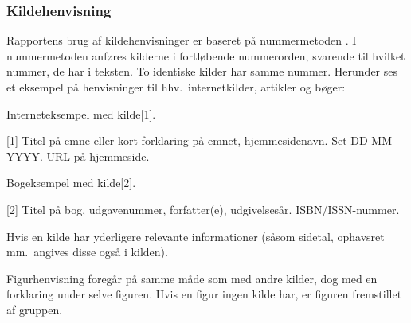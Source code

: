 \subsubsection{Kildehenvisning}
Rapportens brug af kildehenvisninger er baseret på nummermetoden \cite{nummermetoden}. I nummermetoden anføres kilderne i fortløbende nummerorden, svarende til hvilket nummer, de har i teksten. To identiske kilder har samme nummer. Herunder ses et eksempel på henvisninger til hhv.\ internetkilder, artikler og bøger:

Interneteksempel med kilde[1].

[1] Titel på emne eller kort forklaring på emnet, hjemmesidenavn. Set DD-MM-YYYY. URL på hjemmeside.


Bogeksempel med kilde[2].

[2] Titel på bog, udgavenummer, forfatter(e), udgivelsesår. ISBN/ISSN-nummer.


Hvis en kilde har yderligere relevante informationer (såsom sidetal, ophavsret mm.\ angives disse også i kilden).


Figurhenvisning foregår på samme måde som med andre kilder, dog med en forklaring under selve figuren. Hvis en figur ingen kilde har, er figuren fremstillet af gruppen.
